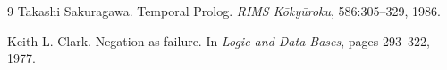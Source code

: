 \documentclass[11pt]{article}
\begin{document}
\begin{thebibliography}{9}
Takashi Sakuragawa.
\newblock Temporal Prolog.
\newblock \emph{RIMS K\={o}ky\={u}roku}, 586:305--329, 1986.

Keith L. Clark.
\newblock Negation as failure.
\newblock In \emph{Logic and Data Bases}, pages 293--322, 1977.
\end{thebibliography}
\end{document}

